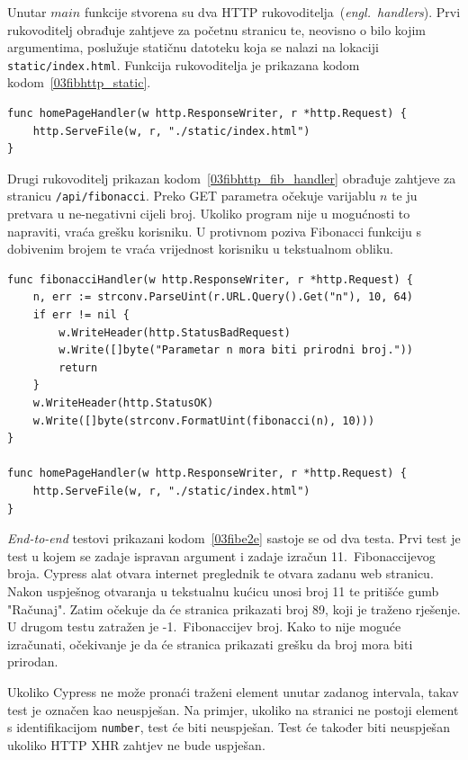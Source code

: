Unutar $main$ funkcije stvorena su dva HTTP rukovoditelja~(\textit{engl.~handlers}). Prvi
rukovoditelj obrađuje zahtjeve za početnu stranicu te, neovisno o bilo kojim argumentima, poslužuje
statičnu datoteku koja se nalazi na lokaciji \texttt{static/index.html}. Funkcija rukovoditelja je
prikazana kodom kodom~\ref{03fibhttp_static}.
\begin{lstlisting}[float=h]
func homePageHandler(w http.ResponseWriter, r *http.Request) {
	http.ServeFile(w, r, "./static/index.html")
}
\end{lstlisting}

Drugi rukovoditelj prikazan kodom~\ref{03fibhttp_fib_handler} obrađuje zahtjeve za stranicu
\texttt{/api/fibonacci}. Preko GET parametra očekuje varijablu $n$ te ju pretvara u ne-negativni
cijeli broj. Ukoliko program nije u mogućnosti to napraviti, vraća grešku korisniku. U protivnom
poziva Fibonacci funkciju s dobivenim brojem te vraća vrijednost korisniku u tekstualnom obliku.

\begin{lstlisting}[float=h]
func fibonacciHandler(w http.ResponseWriter, r *http.Request) {
	n, err := strconv.ParseUint(r.URL.Query().Get("n"), 10, 64)
	if err != nil {
		w.WriteHeader(http.StatusBadRequest)
		w.Write([]byte("Parametar n mora biti prirodni broj."))
		return
	}
	w.WriteHeader(http.StatusOK)
	w.Write([]byte(strconv.FormatUint(fibonacci(n), 10)))
}

func homePageHandler(w http.ResponseWriter, r *http.Request) {
	http.ServeFile(w, r, "./static/index.html")
}
\end{lstlisting}

\textit{End-to-end} testovi prikazani kodom~\ref{03fibe2e} sastoje se od dva testa. Prvi test je
test u kojem se zadaje ispravan argument i zadaje izračun 11.~Fibonaccijevog broja. Cypress alat
otvara internet preglednik te otvara zadanu web stranicu. Nakon uspješnog otvaranja u tekstualnu
kućicu unosi broj 11 te pritišće gumb "Računaj". Zatim očekuje da će stranica prikazati broj 89,
koji je traženo rješenje. U drugom testu zatražen je -1.~Fibonaccijev broj. Kako to nije moguće
izračunati, očekivanje je da će stranica prikazati grešku da broj mora biti prirodan.

Ukoliko Cypress ne može pronaći traženi element unutar zadanog intervala, takav test je označen kao
neuspješan. Na primjer, ukoliko na stranici ne postoji element s identifikacijom \texttt{number},
test će biti neuspješan. Test će također biti neuspješan ukoliko HTTP XHR zahtjev ne bude uspješan.


